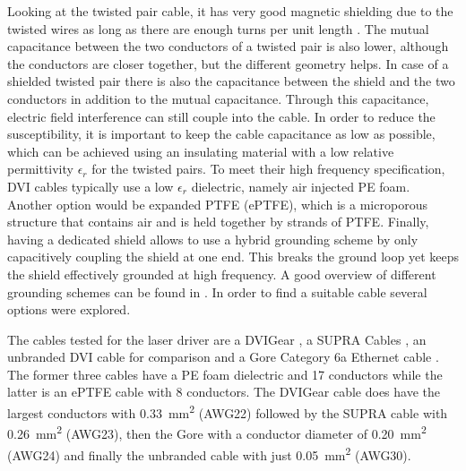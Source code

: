 Looking at the twisted pair cable, it has very good magnetic shielding due to the twisted wires as long as there are enough turns per unit length \cite{ott_electromagnetic, twisted_pair_magnetic_shielding}. The mutual capacitance between the two conductors of a twisted pair is also lower, although the conductors are closer together, but the different geometry helps.  In case of a shielded twisted pair there is also the capacitance between the shield and the two conductors in addition to the mutual capacitance. Through this capacitance, electric field interference can still couple into the cable. In order to reduce the susceptibility, it is important to keep the cable capacitance as low as possible, which can be achieved using an insulating material with a low relative permittivity $\epsilon_r$ for the twisted pairs. To meet their high frequency specification, DVI cables typically use a low $\epsilon_r$ dielectric, namely air injected PE foam. Another option would be expanded PTFE (ePTFE), which is a microporous structure that contains air and is held together by strands of PTFE. Finally, having a dedicated shield allows to use a hybrid grounding scheme by only capacitively coupling the shield at one end. This breaks the ground loop yet keeps the shield effectively grounded at high frequency. A good overview of different grounding schemes can be found in \citep[p. 72]{ott_electromagnetic}. In order to find a suitable cable several options were explored.

The cables tested for the laser driver are a DVIGear  \cite{dvigear_SHR}, a SUPRA Cables  \cite{supra_dvi_cable}, an unbranded DVI cable for comparison and a Gore  Category 6a Ethernet cable \cite{gore_cat6}. The former three cables have a PE foam dielectric and \num{17} conductors while the latter is an ePTFE cable with \num{8} conductors. The DVIGear  cable does have the largest conductors with \qty{0.33}{\square\mm} (AWG22) followed by the SUPRA cable with \qty{0.26}{\square\mm} (AWG23), then the Gore  with a conductor diameter of \qty{0.20}{\square\mm} (AWG24) and finally the unbranded cable with just \qty{0.05}{\square\mm} (AWG30).

